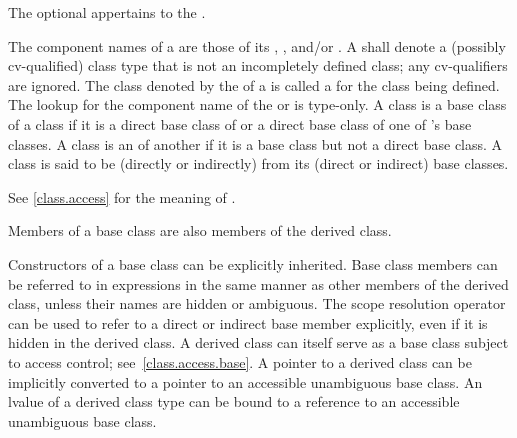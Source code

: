 The optional  appertains to the .

\pnum
{}%
The component names of a  are those of its
,
, and/or
.
%
A  shall denote
a (possibly cv-qualified) class type that is not
an incompletely defined class;
any cv-qualifiers are ignored.
The class denoted by the  of
a  is called a
for the class being defined.
%
%
The lookup for the component name of
the  or 
is type-only.
A class  is a
base class of a class  if it is a direct base class of
 or a direct base class of one of 's base classes.
A class is an  of another if it is a base
class but not a direct base class. A class is said to be (directly or
indirectly)  from its (direct or indirect) base
classes.
\begin{note}
See \ref{class.access} for the meaning of
.
\end{note}
%
Members of a base class are also members of the derived class.
\begin{note}
Constructors of a base class can be explicitly inherited.
Base class members can be referred to in
expressions in the same manner as other members of the derived class,
unless their names are hidden or ambiguous.
%
The scope resolution operator \tcode{::} can be used
to refer to a direct or indirect base member explicitly,
even if it is hidden in the derived class.
A derived class can itself serve as a base class subject to access
control; see~\ref{class.access.base}. A pointer to a derived class can be
implicitly converted to a pointer to an accessible unambiguous base
class. An lvalue of a derived class type can be bound
to a reference to an accessible unambiguous base
class.
\end{note}

